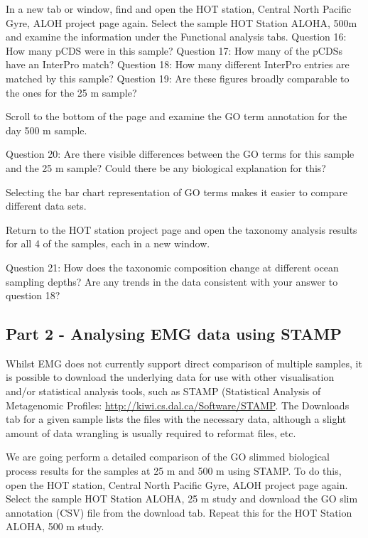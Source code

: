 \begin{steps}
In a new tab or window, find and open the HOT station, Central North Pacific Gyre, ALOH project page again. Select the sample HOT Station ALOHA, 500m and examine the information under the Functional analysis tabs.
  Question 16: How many pCDS were in this sample?
  Question 17: How many of the pCDSs have an InterPro match?
  Question 18: How many different InterPro entries are matched by this sample?
  Question 19: Are these figures broadly comparable to the ones for the 25 m sample?
\end{steps}

\begin{steps}
Scroll to the bottom of the page and examine the GO term annotation for the day 500 m sample.

Question 20: Are there visible differences between the GO terms for this sample and the 25 m sample? Could there be any biological explanation for this?
  
  
Selecting the bar chart representation of GO terms makes it easier to compare different data sets.
\end{steps}

\begin{steps}
Return to the HOT station project page and open the taxonomy analysis results for all 4 of the samples, each in a new window.
  
Question 21: How does the taxonomic composition change at different ocean sampling depths? Are any trends in the data consistent with your answer to question 18?


\end{steps}

\subsection{Part 2 - Analysing EMG data using STAMP}

Whilst EMG does not currently support direct comparison of multiple samples, it is possible to download the underlying data for use with other visualisation and/or statistical analysis tools, such as STAMP (Statistical Analysis of Metagenomic Profiles: \url{http://kiwi.cs.dal.ca/Software/STAMP}. The Downloads tab for a given sample lists the files with the necessary data, although a slight amount of data wrangling is usually required to reformat files, etc.

\begin{steps}
We are going perform a detailed comparison of the GO slimmed biological process results for the samples at 25 m and 500 m using STAMP. To do this, open the HOT station, Central North Pacific Gyre, ALOH project page again. Select the sample HOT Station ALOHA, 25 m study and download the GO slim annotation (CSV) file from the download tab. Repeat this for the HOT Station ALOHA, 500 m study.
\end{steps}

